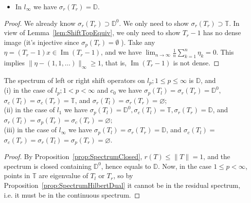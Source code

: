 \begin{proposition}
	\begin{itemize}
		\item In $l_\infty $ we have $\sigma_r(T_r) = \mathbb{D}$.
	\end{itemize}

\end{proposition}
\begin{proof}
	
	We already know $\sigma_r(T_r) \supset \mathbb{D}^0$. We only need to show $\sigma_r(T_r) \supset \mathbb{T}$. In view of Lemma~\ref{lem:ShiftTopEquiv}, we only need to show $T_r - 1$ has no dense image (it's injective since $\sigma_p(T_r) = \emptyset $ ). Take any $\eta = (T_r - 1) x \in \operatorname{Im} (T_r - 1)$, and we have $\lim_{n \to \infty} \frac{1}{n} \sum_{k=1}^{n} \eta_k = 0$. This implies $\|\eta - (1, 1, \ldots)\|_\infty \ge 1$, that is, $\operatorname{Im} (T_r - 1)$ is not dense.
\end{proof}

\begin{proposition}
	\label{prop:SpectShift}
	The spectrum of left or right shift operators on $l_p; 1 \le p \le \infty $ is $\mathbb{D}$, and\\
	(i) in the case of $l_p ; 1<p<\infty$ and $c_0$ we have $\sigma_p\left(T_l\right)=\sigma_r\left(T_r\right)=\mathbb{D}^0$, $\sigma_c\left(T_l\right)=\sigma_c\left(T_r\right)=\mathbb{T}$, and $\sigma_r\left(T_l\right)=\sigma_r\left(T_r\right)=\varnothing$;\\
(ii) in the case of $l_1$ we have $\sigma_p\left(T_l\right)=\mathbb{D}^0, \sigma_c\left(T_l\right)=\mathbb{T}, \sigma_r\left(T_r\right)=\mathbb{D}$, and $\sigma_r\left(T_l\right)=\sigma_p\left(T_r\right)=\sigma_c\left(T_r\right)=\varnothing ;$\\
(iii) in the case of $l_{\infty}$ we have $\sigma_p\left(T_l\right)=\sigma_r\left(T_r\right)=\mathbb{D}$, and $\sigma_c\left(T_l\right)=$ $\sigma_c\left(T_r\right)=\sigma_r\left(T_l\right)=\sigma_p\left(T_r\right)=\varnothing$.
\end{proposition}
\begin{proof}
	By Proposition~\ref{prop:SpectrumClosed}, $r(T) \le \|T\| = 1$, and the spectrum is closed containing $\mathbb{D}^0$, hence equals to $\mathbb{D}$. Now, in the case $1 \le p < \infty $, points in $\mathbb{T}$ are eigenvalue of $T_l$ or $T_r$, so by Proposition~\ref{prop:SpectrumHilbertDual} it cannot be in the residual spectrum, i.e. it must be in the continuous spectrum.
\end{proof}



